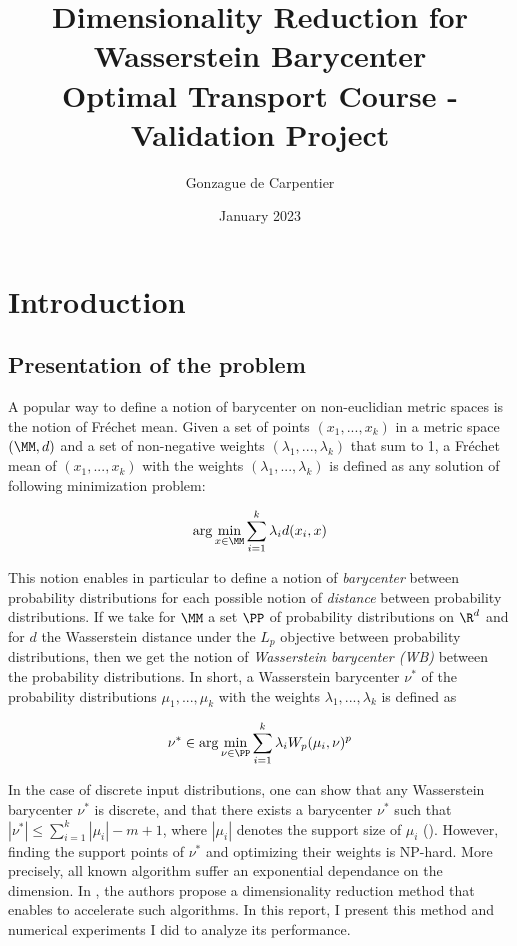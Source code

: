 \documentclass[11pt,a4paper]{article}
\title{Dimensionality Reduction for Wasserstein Barycenter \\[1ex] \large Optimal Transport Course - Validation Project}
\author{Gonzague de Carpentier}
\date{January 2023}
\begin{document}
\maketitle

\section{Introduction}

\subsection{Presentation of the problem}

A popular way to define a notion of barycenter on non-euclidian metric spaces is the notion of Fréchet mean. Given a set of points $(x_1, ..., x_k)$ in a metric space $(\MM, d)$ and a set of non-negative weights $(\lambda_1, ..., \lambda_k)$ that sum to 1, a Fréchet mean of $(x_1, ..., x_k)$ with the weights $(\lambda_1, ..., \lambda_k)$ is defined as any solution of following minimization problem:

$$\arg \min_{x \in \MM} \sum_{i=1}^k \lambda_i d(x_i, x)$$

This notion enables in particular to define a notion of \emph{barycenter} between probability distributions for each possible notion of \emph{distance} between probability distributions. If we take for $\MM$ a set $\PP$ of probability distributions on $\R^d$ and for $d$ the Wasserstein distance under the $L_p$ objective between probability distributions, then we get the notion of \emph{Wasserstein barycenter (WB)} between the probability distributions. In short, a Wasserstein barycenter $\nu^*$ of the probability distributions $\mu_1, ..., \mu_k$ with the weights $\lambda_1, ..., \lambda_k$ is defined as

$$\nu^* \in \arg \min_{\nu \in \PP} \sum_{i=1}^k \lambda_i W_p(\mu_i, \nu)^p$$

In the case of discrete input distributions, one can show that any Wasserstein barycenter $\nu^*$ is discrete, and that there exists a barycenter $\nu^*$ such that $|\nu^*| \leq \sum_{i=1}^k |\mu_i| - m + 1$, where $|\mu_i|$ denotes the support size of $\mu_i$ (\cite{borgwardt_computational_2022}). However, finding the support points of $\nu^*$ and optimizing their weights is NP-hard. More precisely, all known algorithm suffer an exponential dependance on the dimension. In \cite{izzo_dimensionality_2021}, the authors propose a dimensionality reduction method that enables to accelerate such algorithms. In this report, I present this method and numerical experiments I did to analyze its performance.
\end{document}
